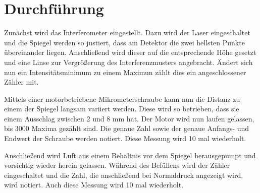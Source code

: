 \section{Durchführung}
\label{sec:Durchführung}

Zunächst wird das Interferometer eingestellt.
Dazu wird der Laser eingeschaltet und die Spiegel werden so justiert, dass am Detektor die zwei hellsten Punkte übereinander liegen.
Anschließend wird dieser auf die entsprechende Höhe gesetzt und eine Linse zur Vergrößerung des Interferenzmusters angebracht.
Ändert sich nun ein Intensitätsminimum zu einem Maximun zählt dies ein angeschlossener Zähler mit.

Mittels einer motorbetriebene Mikrometerschraube kann nun die Distanz zu einem der Spiegel langsam variiert werden.
Diese wird so betrieben, dass sie einem Ausschlag zwischen 2 und 8 mm hat.
Der Motor wird nun laufen gelassen, bis 3000 Maxima gezählt sind. Die genaue Zahl sowie der genaue Anfangs- und Endwert der Schraube werden notiert.
Diese Messung wird 10 mal wiederholt.

Anschließend wird Luft aus einem Behältnis vor dem Spiegel herausgepumpt und vorsichtig wieder herein gelassen.
Während des Befüllens wird der Zähler eingeschaltet und die Zahl, die anschließend bei Normaldruck angezeigt wird, wird notiert.
Auch diese Messung wird 10 mal wiederholt.